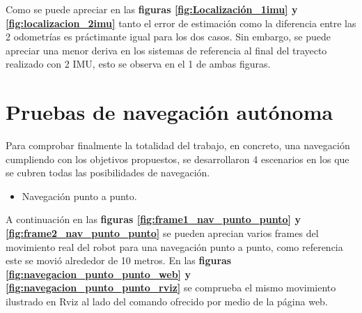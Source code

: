 Como se puede apreciar en las \textbf{figuras \ref{fig:Localización_1imu} y \ref{fig:localizacion_2imu}} tanto el error de estimación como la diferencia entre las 
2 odometrías es práctimante igual para los dos casos. Sin embargo, se puede apreciar una menor deriva en los sistemas de referencia al final del 
trayecto realizado con 2 IMU, esto se observa en el 1 de ambas figuras.
\section{Pruebas de navegación autónoma}

Para comprobar finalmente la totalidad del trabajo, en concreto, una navegación cumpliendo con los objetivos propuestos, se desarrollaron 4 escenarios en los que se cubren todas 
las posibilidades de navegación.
\begin{itemize}
  \item Navegación punto a punto.
\end{itemize}
A continuación en las \textbf{figuras \ref{fig:frame1_nav_punto_punto} y \ref{fig:frame2_nav_punto_punto}} se pueden aprecian varios frames del movimiento real del robot para una navegación punto a punto, como referencia este se movió alrededor de 10 metros. En 
las \textbf{figuras \ref{fig:navegacion_punto_punto_web} y \ref{fig:navegacion_punto_punto_rviz}} se comprueba el mismo movimiento ilustrado en Rviz al lado del comando ofrecido por medio de la página web.

